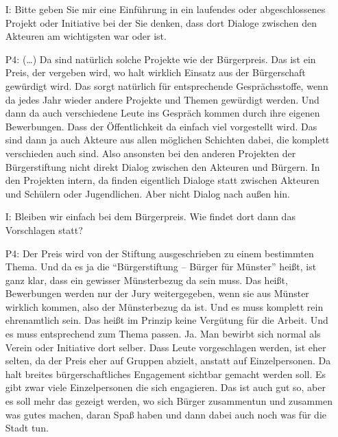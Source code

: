 \begin{itemize}
    \item[I:] Bitte geben Sie mir eine Einf{\"u}hrung in ein laufendes oder abgeschlossenes Projekt oder Initiative bei der Sie denken, dass dort Dialoge zwischen den Akteuren am wichtigsten war oder ist.
    \item[P4:] (\dots) Da sind nat{\"u}rlich solche Projekte wie der B{\"u}rgerpreis. Das ist ein Preis, der vergeben wird, wo halt wirklich Einsatz  aus der B{\"u}rgerschaft gew{\"u}rdigt wird. Das sorgt nat{\"u}rlich f{\"u}r entsprechende Gespr{\"a}chsstoffe, wenn da jedes Jahr wieder andere Projekte und Themen gew{\"u}rdigt werden. Und dann da auch verschiedene Leute ins Gespr{\"a}ch kommen durch ihre eigenen Bewerbungen. Dass der {\"O}ffentlichkeit da einfach viel vorgestellt wird. Das sind dann ja auch Akteure aus allen m{\"o}glichen Schichten dabei, die komplett verschieden auch sind. Also ansonsten bei den anderen Projekten der B{\"u}rgerstiftung nicht direkt Dialog zwischen den Akteuren und B{\"u}rgern. In den Projekten intern, da finden eigentlich Dialoge statt zwischen Akteuren und Sch{\"u}lern oder Jugendlichen. Aber nicht Dialog nach au{\ss}en hin.
    \item[I:] Bleiben wir einfach bei dem B{\"u}rgerpreis. Wie findet dort dann das Vorschlagen statt?
    \item[P4:] Der Preis wird von der Stiftung ausgeschrieben zu einem bestimmten Thema. Und da es ja die "`B{\"u}rgerstiftung -- B{\"u}rger f{\"u}r M{\"u}nster"' hei{\ss}t, ist ganz klar, dass ein gewisser M{\"u}nsterbezug da sein muss. Das hei{\ss}t, Bewerbungen werden nur der Jury weitergegeben, wenn sie aus M{\"u}nster wirklich kommen, also der M{\"u}nsterbezug da ist. Und es muss komplett rein ehrenamtlich sein. Das hei{\ss}t im Prinzip keine Verg{\"u}tung f{\"u}r die Arbeit. Und es muss entsprechend zum Thema passen. Ja. Man bewirbt sich normal als Verein oder Initiative dort selber. Dass Leute vorgeschlagen werden, ist eher selten, da der Preis eher auf Gruppen abzielt, anstatt auf Einzelpersonen. Da halt breites b{\"u}rgerschaftliches Engagement sichtbar gemacht werden soll. Es gibt zwar viele Einzelpersonen die sich engagieren. Das ist auch gut so, aber es soll mehr das gezeigt werden, wo sich B{\"u}rger zusammentun und zusammen was gutes machen, daran Spa{\ss} haben und dann dabei auch noch was f{\"u}r die Stadt tun.
\end{itemize}

